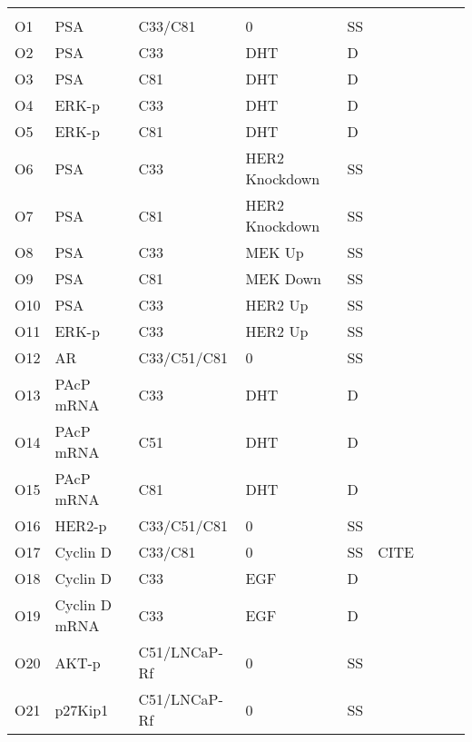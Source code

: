 \begin{center}
\label{objective_table}
\begin{scriptsize}
\begin{supertabular}{l l l l l l l l l }  
\hline \\ 												
O1  & PSA & C33/C81 & 0  & SS & \cite{Lee2003} \\
O2  & PSA & C33 & DHT & D & \cite{Lee2003} \\
O3  & PSA & C81 & DHT & D &  \cite{Lee2003} \\
O4  & ERK-p & C33 & DHT & D &  \cite{Lee2003} \\
O5  & ERK-p & C81 & DHT & D & \cite{Lee2003} \\
O6  & PSA & C33 & HER2 Knockdown & SS & \cite{Lee2003} \\
O7  & PSA & C81 & HER2 Knockdown & SS & \cite{Lee2003} \\
O8  & PSA & C33 & MEK Up & SS & \cite{Lee2003} \\
O9  & PSA & C81 & MEK Down & SS & \cite{Lee2003} \\
O10  & PSA & C33 & HER2 Up & SS & \cite{Lee2003} \\
O11  & ERK-p & C33 & HER2 Up & SS & \cite{Lee2003} \\
O12  & AR & C33/C51/C81 & 0 & SS & \cite{Lin2000} \\
O13  & PAcP mRNA & C33 & DHT & D & \cite{Lin2000} \\
O14  & PAcP mRNA & C51 & DHT & D & \cite{Lin2000} \\
O15  & PAcP mRNA & C81 & DHT & D & \cite{Lin2000} \\
O16  & HER2-p & C33/C51/C81 & 0 & SS & \cite{Yuan2007} \\
O17  & Cyclin D & C33/C81 & 0 & SS & CITE \\
O18  & Cyclin D & C33 & EGF & D &  \cite{Perry1998}\\
O19  & Cyclin D mRNA & C33 & EGF & D &  \cite{Perry1998}\\
O20  & AKT-p & C51/LNCaP-Rf  & 0 & SS & \cite{Murillo2001}\\
O21  & p27Kip1 & C51/LNCaP-Rf  & 0 & SS & \cite{Murillo2001}\\

\end{supertabular}
\end{scriptsize}
\end{center}

